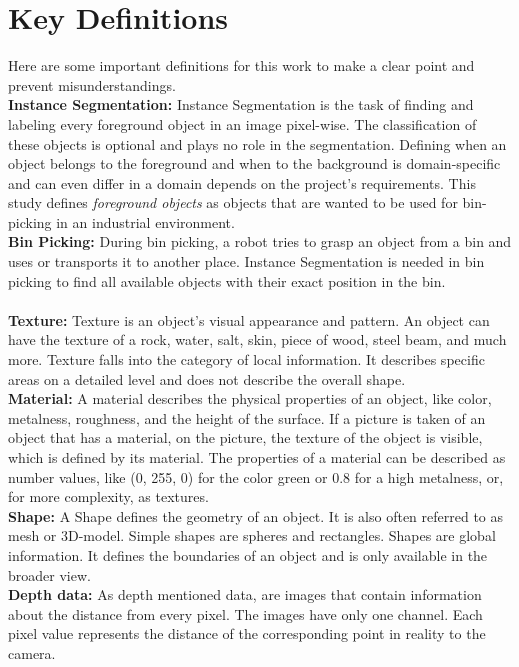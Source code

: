 	\section{Key Definitions}
	\label{sec:key-definitions}
		Here are some important definitions for this work to make a clear point and prevent misunderstandings.\\
		\textbf{Instance Segmentation:} Instance Segmentation is the task of finding and labeling every foreground object in an image pixel-wise. The classification of these objects is optional and plays no role in the segmentation. Defining when an object belongs to the foreground and when to the background is domain-specific and can even differ in a domain depends on the project's requirements. This study defines \textit{foreground objects} as objects that are wanted to be used for bin-picking in an industrial environment.\\ %
		\textbf{Bin Picking:} During bin picking, a robot tries to grasp an object from a bin and uses or transports it to another place. Instance Segmentation is needed in bin picking to find all available objects with their exact position in the bin.\\
		\\
		\textbf{Texture:} Texture is an object's visual appearance and pattern. An object can have the texture of a rock, water, salt, skin, piece of wood, steel beam, and much more. Texture falls into the category of local information. It describes specific areas on a detailed level and does not describe the overall shape.\\
		\textbf{Material:} A material describes the physical properties of an object, like color, metalness, roughness, and the height of the surface. If a picture is taken of an object that has a material, on the picture, the texture of the object is visible, which is defined by its material. The properties of a material can be described as number values, like (0, 255, 0) for the color green or 0.8 for a high metalness, or, for more complexity, as textures.\\
		\textbf{Shape:} A Shape defines the geometry of an object. It is also often referred to as mesh or 3D-model. Simple shapes are spheres and rectangles. Shapes are global information. It defines the boundaries of an object and is only available in the broader view.\\
		\textbf{Depth data:} As depth mentioned data, are images that contain information about the distance from every pixel. The images have only one channel. Each pixel value represents the distance of the corresponding point in reality to the camera.\\

